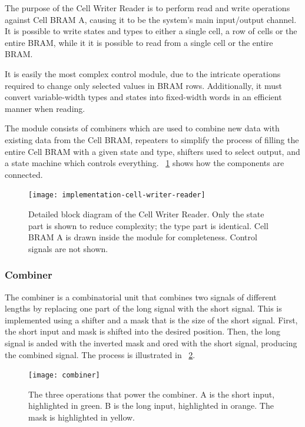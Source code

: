 The purpose of the Cell Writer Reader is to perform read and write operations against Cell BRAM A, causing it to be the system's main input/output channel.
It is possible to write states and types to either a single cell, a row of cells or the entire BRAM, while it it is possible to read from a single cell or the entire BRAM.

It is easily the most complex control module, due to the intricate operations required to change only selected values in BRAM rows.
Additionally, it must convert variable-width types and states into fixed-width words in an efficient manner when reading.

The module consists of combiners which are used to combine new data with existing data from the Cell BRAM, repeaters to simplify the process of filling the entire Cell BRAM with a given state and type, shifters used to select output, and a state machine which controls everything.
\figurename~\ref{fig:implementation-cell-writer-reader} shows how the components are connected.

\begin{figure}[!ht]
    \hspace{-0.02\textwidth}
    \texttt{[image: implementation-cell-writer-reader]}
    \caption[Cell Writer Reader]{
        Detailed block diagram of the Cell Writer Reader.
        Only the state part is shown to reduce complexity; the type part is identical.
        Cell BRAM A is drawn inside the module for completeness.
        Control signals are not shown.
    }
    \label{fig:implementation-cell-writer-reader}
\end{figure}

\subsubsection{Combiner}

The combiner is a combinatorial unit that combines two signals of different lengths by replacing one part of the long signal with the short signal.
This is implemented using a shifter and a mask that is the size of the short signal.
First, the short input and mask is shifted into the desired position.
Then, the long signal is anded with the inverted mask and ored with the short signal, producing the combined signal.
The process is illustrated in \figurename~\ref{fig:combiner}.

\begin{figure}[!ht]
    \centering
    \texttt{[image: combiner]}
    \caption[Combiner operation]{
        The three operations that power the combiner.
        A is the short input, highlighted in green.
        B is the long input, highlighted in orange.
        The mask is highlighted in yellow.
    }
    \label{fig:combiner}
\end{figure}

